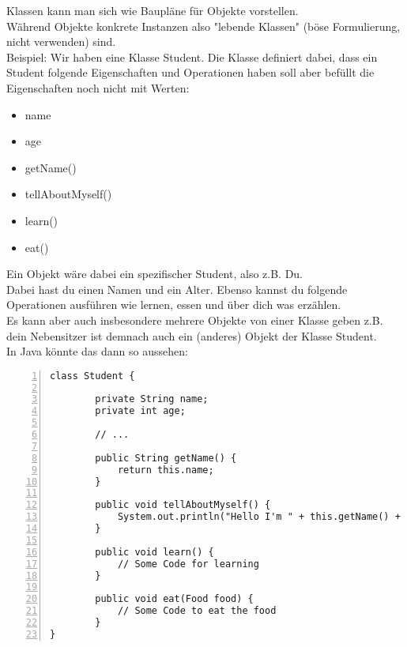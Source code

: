 


\begin{Infobox}
    Klassen kann man sich wie Baupläne für Objekte vorstellen.\\
    Während Objekte konkrete Instanzen also "lebende Klassen" (böse Formulierung, nicht verwenden) sind.\\

    Beispiel: Wir haben eine Klasse Student.
    Die Klasse definiert dabei, dass ein Student folgende Eigenschaften und Operationen haben soll aber befüllt die Eigenschaften noch nicht mit Werten:
    
    \begin{itemize}
        \item name
        \item age
        \item getName()
        \item tellAboutMyself()
        \item learn()
        \item eat()
    \end{itemize}

    Ein Objekt wäre dabei ein spezifischer Student, also z.B. Du.\\
    Dabei hast du einen Namen und ein Alter.
    Ebenso kannst du folgende Operationen ausführen wie lernen, essen und über dich was erzählen.\\
    Es kann aber auch insbesondere mehrere Objekte von einer Klasse geben z.B. dein Nebensitzer ist demnach auch ein (anderes) Objekt der Klasse Student.\\

    In Java könnte das dann so aussehen:

    \begin{lstlisting}[numbers=left,xleftmargin=2em,frame=single,framexleftmargin=1.5em]
class Student {

        private String name;
        private int age;

        // ...

        public String getName() {
            return this.name;
        }

        public void tellAboutMyself() {
            System.out.println("Hello I'm " + this.getName() + ". I'm " + age + " old!";
        }

        public void learn() {
            // Some Code for learning
        }

        public void eat(Food food) {
            // Some Code to eat the food
        }
}

    \end{lstlisting}
\end{Infobox}

